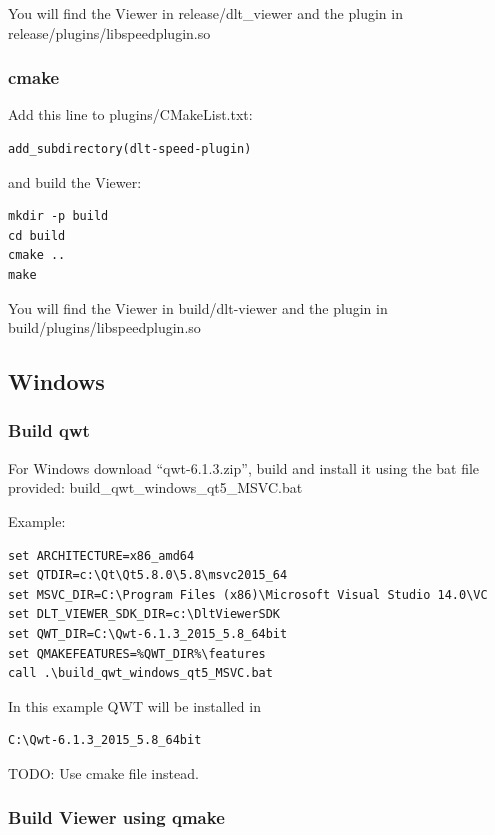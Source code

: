 \documentclass[a4paper,11pt]{article}
\begin{document}
You will find the Viewer in release/dlt\_viewer and the plugin in release/plugins/libspeedplugin.so

\subsubsection{cmake}

Add this line to plugins/CMakeList.txt:

\begin{verbatim}
add_subdirectory(dlt-speed-plugin)
\end{verbatim}

and build the Viewer:

\begin{verbatim}
mkdir -p build
cd build
cmake ..
make
\end{verbatim}

You will find the Viewer in build/dlt-viewer and the plugin in build/plugins/libspeedplugin.so

\subsection{Windows}

\subsubsection{Build qwt}

For Windows download ``qwt-6.1.3.zip'', build and install it using the bat file provided:
build\_qwt\_windows\_qt5\_MSVC.bat

Example:
\begin{verbatim}
set ARCHITECTURE=x86_amd64
set QTDIR=c:\Qt\Qt5.8.0\5.8\msvc2015_64
set MSVC_DIR=C:\Program Files (x86)\Microsoft Visual Studio 14.0\VC
set DLT_VIEWER_SDK_DIR=c:\DltViewerSDK
set QWT_DIR=C:\Qwt-6.1.3_2015_5.8_64bit
set QMAKEFEATURES=%QWT_DIR%\features
call .\build_qwt_windows_qt5_MSVC.bat
\end{verbatim}

In this example QWT will be installed in
\begin{verbatim}
C:\Qwt-6.1.3_2015_5.8_64bit
\end{verbatim}

TODO: Use cmake file instead.
\subsubsection{Build Viewer using qmake}
\end{document}

